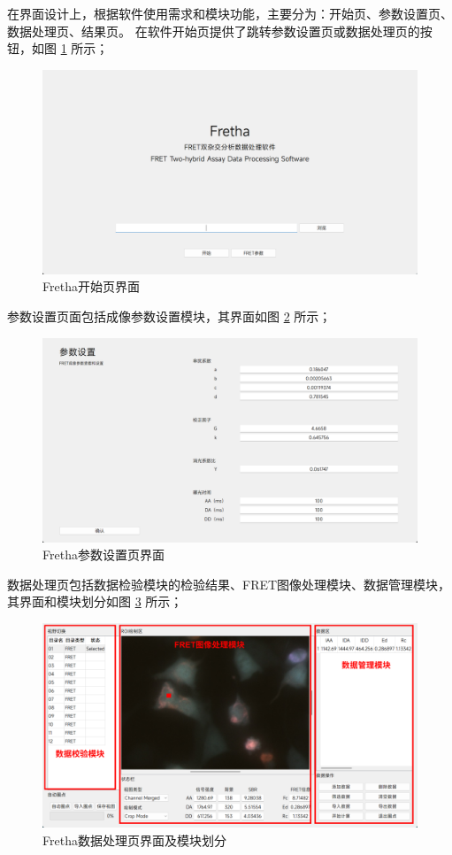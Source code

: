在界面设计上，根据软件使用需求和模块功能，主要分为：开始页、参数设置页、数据处理页、结果页。
在软件开始页提供了跳转参数设置页或数据处理页的按钮，如图 \ref{fig:开始页界面} 所示；
\begin{figure}[hbtp]
  \centering
  \includegraphics[width=0.9\linewidth]{../figures/2/Fretha界面-开始界面.drawio.png}
  \caption{Fretha开始页界面}
  \label{fig:开始页界面}
\end{figure}
参数设置页面包括成像参数设置模块，其界面如图 \ref{fig:参数设置页界面} 所示；
\begin{figure}[hbtp]
  \centering
  \includegraphics[width=0.9\linewidth]{../figures/2/Fretha界面-参数设置.drawio.png}
  \caption{Fretha参数设置页界面}
  \label{fig:参数设置页界面}
\end{figure}
数据处理页包括数据检验模块的检验结果、FRET图像处理模块、数据管理模块，其界面和模块划分如图 \ref {fig:界面模块分布图} 所示；
\begin{figure}[hbtp]
  \centering
  \includegraphics[width=0.9\linewidth]{../figures/2/Fretha界面-数据处理.drawio.png}
  \caption{Fretha数据处理页界面及模块划分}
  \label{fig:界面模块分布图}
\end{figure}

